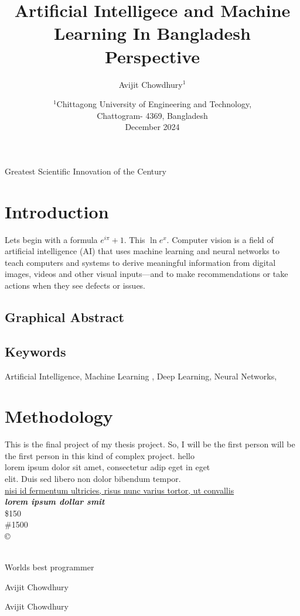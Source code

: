 \documentclass{article}
\title{Artificial Intelligece and Machine Learning In Bangladesh Perspective}
\author{Avijit Chowdhury$^1$}
\date{
\small{
{ %
$^1$Chittagong University of Engineering and Technology,\\
Chattogram- 4369, Bangladesh\\%
    }}
    December 2024   }
\begin{document}
\listoffigures

\listoftables
\tableofcontents
\maketitle
\vspace{-1mm}
\begin{center}
    Greatest Scientific Innovation of the Century
\end{center}

\section{Introduction}
Lets begin with a formula \( e^{i\pi}+1 \). This \( \ln e^{x} \).
Computer vision is a field of artificial intelligence (AI) that uses machine learning and neural networks to teach computers and systems to derive meaningful information from digital images, videos and other visual inputs—and to make recommendations or take actions when they see defects or issues.

\subsection{Graphical Abstract}
\subsection{Keywords}
Artificial Intelligence, Machine Learning \cite{xiao2022novel}, Deep Learning, Neural Networks,
\section{Methodology}
This is the final project of my thesis project. So, I will be the first person
\small
will be the first person in this kind of complex project. hello\\
\large
lorem ipsum dolor sit amet, consectetur adip eget in eget \\
\huge
    elit. Duis sed libero non dolor bibendum tempor. \\
\tiny
\underline{nisi id fermentum ultricies, risus nunc varius tortor, ut convallis} \\
\large
\textbf{\textit{ lorem ipsum dollar smit}} \\
\$150 \\
\#1500 \\
\copyright \\
\textregistered \\
\begin{center}
Worlds best programmer
\end{center}
\begin{flushright}
    Avijit Chowdhury
\end{flushright}
\begin{flushleft}
    Avijit Chowdhury
\end{flushleft}
\end{document}
